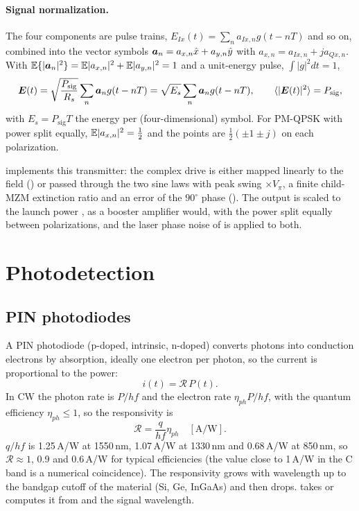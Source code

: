 \paragraph{Signal normalization.} The four components are pulse trains,
$E_{Ix}(t)=\sum_na_{Ix,n}g(t-nT)$ and so on, combined into the vector symbols
$\bm{a}_n=a_{x,n}\hat x+a_{y,n}\hat y$ with $a_{x,n}=a_{Ix,n}+ja_{Qx,n}$. With
$\mathbb{E}\{|\bm{a}_n|^2\}=\mathbb{E}|a_{x,n}|^2+\mathbb{E}|a_{y,n}|^2=1$ and a unit-energy pulse, $\int|g|^2dt=1$,
\begin{equation}
  \bm{E}(t)=\sqrt{\frac{P_{\mathrm{sig}}}{R_s}}\sum_n\bm{a}_ng(t-nT)=\sqrt{E_s}\sum_n\bm{a}_ng(t-nT),\qquad
  \langle|\bm{E}(t)|^2\rangle=P_{\mathrm{sig}},
\end{equation}
with $E_s=P_{\mathrm{sig}}T$ the energy per (four-dimensional) symbol. For PM-QPSK with power split equally,
$\mathbb{E}|a_{x,n}|^2=\frac12$ and the points are $\frac12(\pm1\pm j)$ on each polarization.

 implements this transmitter: the complex drive is either mapped linearly to
the field () or passed through the two sine laws with peak swing
$\times V_\pi$, a finite child-MZM extinction ratio and an error of the $90^\circ$
phase (). The output is scaled to the launch power , as a
booster amplifier would, with the power split equally between polarizations, and the laser phase
noise of  is applied to both.

\section{Photodetection}\label{sec:photodetection}
\subsection{PIN photodiodes}
A PIN photodiode (p-doped, intrinsic, n-doped) converts photons into conduction electrons by
absorption, ideally one electron per photon, so the current is proportional to the power:
\begin{equation}
  i(t)=\mathcal R\,P(t).
\end{equation}
In CW the photon rate is $P/hf$ and the electron rate $\eta_{ph}P/hf$, with the quantum efficiency
$\eta_{ph}\le1$, so the responsivity is
\begin{equation}
  \mathcal R=\frac{q}{hf}\eta_{ph}\quad[\mathrm{A/W}].
\end{equation}
$q/hf$ is 1.25\,A/W at 1550\,nm, 1.07\,A/W at 1330\,nm and 0.68\,A/W at 850\,nm, so $\mathcal R\approx1$, 0.9 and
0.6\,A/W for typical efficiencies (the value close to 1\,A/W in the C band is a numerical
coincidence). The responsivity grows with wavelength up to the bandgap cutoff of the material (Si,
Ge, InGaAs) and then drops.  takes  or computes it from
 and the signal wavelength.

